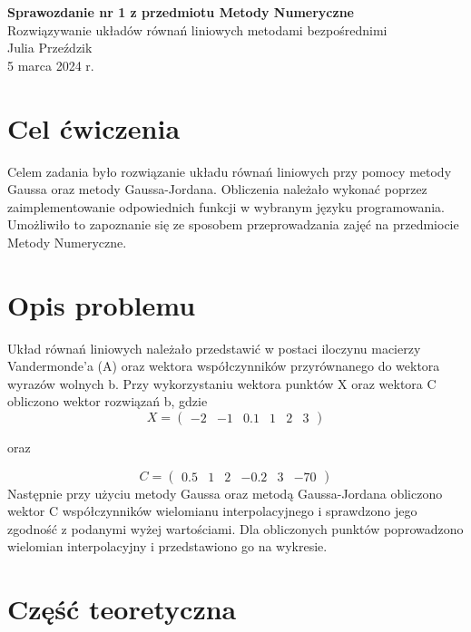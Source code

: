 \documentclass{article}
\begin{document}
\Large
\begin{center}
{\LARGE \textbf{Sprawozdanie nr 1 z przedmiotu Metody Numeryczne}}
\\
{\large{Rozwiązywanie układów równań liniowych metodami bezpośrednimi}}
\\
{\large{Julia Przeździk}}
\\
\normalsize{5 marca 2024 r.}
\\
\end{center}
\large
\tableofcontents
\newpage
\section{Cel ćwiczenia}
Celem zadania było rozwiązanie układu równań liniowych przy pomocy metody Gaussa oraz metody Gaussa-Jordana. Obliczenia należało wykonać poprzez zaimplementowanie odpowiednich funkcji w wybranym języku programowania. Umożliwiło to zapoznanie się ze sposobem przeprowadzania zajęć na przedmiocie Metody Numeryczne. 
\section{Opis problemu}
Układ równań liniowych należało przedstawić w postaci iloczynu macierzy Vandermonde'a (A) oraz wektora współczynników przyrównanego do wektora wyrazów wolnych b. Przy wykorzystaniu wektora punktów X oraz wektora C obliczono wektor rozwiązań b, gdzie 
\[
X = \begin{pmatrix}
-2 & -1 & 0.1 & 1 & 2 & 3
\end{pmatrix}
\]
\begin{center}
oraz
\end{center}
\[
C = \begin{pmatrix}
0.5 & 1 & 2 & -0.2 & 3 & -70
\end{pmatrix}
\]
Następnie przy użyciu metody Gaussa oraz metodą Gaussa-Jordana obliczono wektor C współczynników wielomianu interpolacyjnego i sprawdzono jego zgodność z podanymi wyżej wartościami. Dla obliczonych punktów poprowadzono wielomian interpolacyjny i przedstawiono go na wykresie. 

\section{Część teoretyczna}
\end{document}
